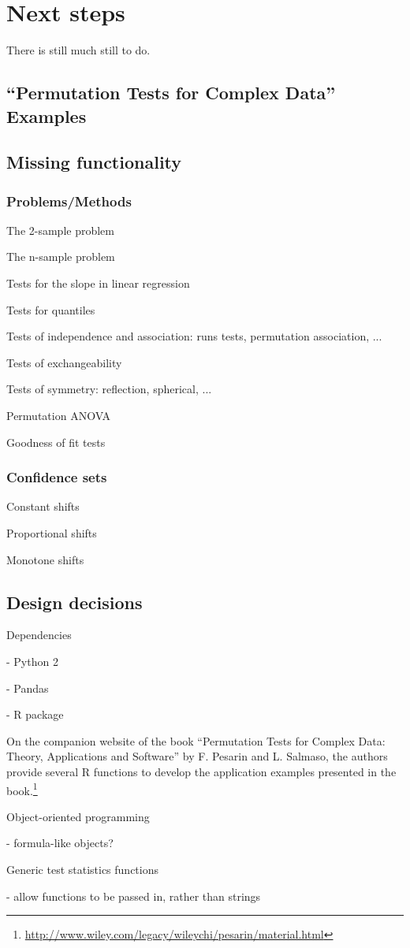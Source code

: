 \chapter{\label{ch:nextsteps}Next steps}

There is still much still to do.

\section{\label{sec:book}``Permutation Tests for Complex Data'' Examples}

\cite{pesarin2010permutation}

\section{Missing functionality}


\subsection{Problems/Methods}

The 2-sample problem

The n-sample problem

Tests for the slope in linear regression 

Tests for quantiles

Tests of independence and association: runs tests, permutation association, ...

Tests of exchangeability

Tests of symmetry: reflection, spherical, ...

Permutation ANOVA

Goodness of fit tests


\subsection{Confidence sets}

Constant shifts

Proportional shifts

Monotone shifts

\section{Design decisions}

Dependencies

- Python 2

- Pandas


- R package

On the companion website of the book ``Permutation Tests for Complex Data:
Theory, Applications and Software'' by F. Pesarin and L. Salmaso, the
authors provide several R functions to develop the application examples
presented in the book.\footnote{\url{http://www.wiley.com/legacy/wileychi/pesarin/material.html}}

Object-oriented programming

- formula-like objects?

Generic test statistics functions

- allow functions to be passed in, rather than strings
